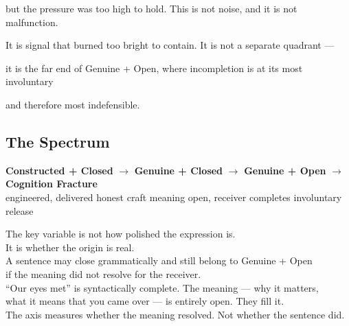 but the pressure was too high to hold. This is not noise, and it is not malfunction.

It is signal that burned too bright to contain. It is not a separate quadrant ---

it is the far end of Genuine + Open, where incompletion is at its most involuntary

and therefore most indefensible.

\subsection{The Spectrum}

\begin{center}

\small\color{midgray}

\textbf{Constructed + Closed} $\longrightarrow$ \textbf{Genuine + Closed} $\longrightarrow$ \textbf{Genuine + Open} $\longrightarrow$ \textbf{Cognition Fracture}\\[0.4em]

engineered, delivered \hspace{0.4cm} honest craft \hspace{0.6cm} meaning open, receiver completes \hspace{0.3cm} involuntary release

\end{center}

\begin{calloutbox}

The key variable is not how polished the expression is.\\

It is whether the origin is real.\\[0.6em]

A sentence may close grammatically and still belong to Genuine + Open\\

if the meaning did not resolve for the receiver.\\

``Our eyes met'' is syntactically complete. The meaning --- why it matters,\\

what it means that you came over --- is entirely open. They fill it.\\[0.4em]

The axis measures whether the meaning resolved. Not whether the sentence did.

\end{calloutbox}

